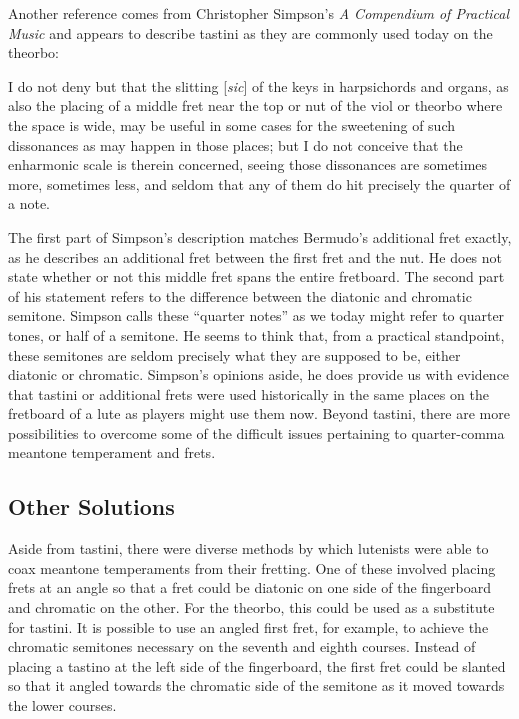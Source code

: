Another reference comes from Christopher Simpson's \textit{A Compendium of Practical
Music} and appears to describe tastini as they are commonly used today on the theorbo:
\begin{blocks}
I do not deny but that the slitting [\textit{sic}] of the keys in harpsichords and organs, as also the
placing of a middle fret near the top or nut of the viol or theorbo where the space is
wide, may be useful in some cases for the sweetening of such dissonances as may happen
in those places; but I do not conceive that the enharmonic scale is therein concerned,
seeing those dissonances are sometimes more, sometimes less, and seldom that any of them
do hit precisely the quarter of a note. \autocite[51]{CS:1}
\end{blocks}
The first part of Simpson's description matches Bermudo's additional fret exactly, as he describes
an additional fret between the first fret and the nut.  He does not state whether or not this middle
fret spans the entire fretboard.  The second part of his statement refers to the difference between
the diatonic and chromatic semitone. Simpson calls these ``quarter notes'' as we today might refer
to quarter tones, or half of a semitone.  He seems to think that, from a practical standpoint, these
semitones are seldom precisely what they are supposed to be, either diatonic or chromatic. Simpson's
opinions aside, he does provide us with evidence that tastini or additional frets were used
historically in the same places on the fretboard of a lute as players might use them now.  Beyond
tastini, there are more possibilities to overcome some of the difficult issues pertaining to
quarter-comma meantone temperament and frets.

\subsection{Other Solutions}

Aside from tastini, there were diverse methods by which lutenists were able to
coax meantone temperaments from their fretting.  One of these involved placing frets at
an angle so that a fret could be diatonic on one side of the fingerboard and chromatic on
the other.  For the theorbo, this could be used as a substitute for tastini.  It
is possible to use an angled first fret, for example, to achieve the chromatic
semitones necessary on the seventh and eighth courses.  Instead of placing a tastino at
the left side of the fingerboard, the first fret could be slanted so that it
angled towards the chromatic side of the semitone as it moved towards the
lower courses.

